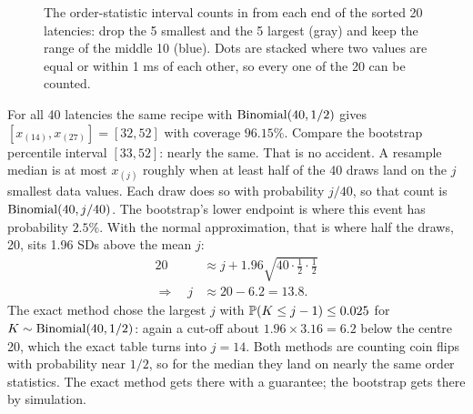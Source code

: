 \begin{figure}[H]
\centering
{}
\caption{The order-statistic interval counts in from each end of the sorted
20 latencies: drop the 5 smallest and the 5 largest (gray) and keep the range
of the middle 10 (blue). Dots are stacked where two values are equal or within
1 ms of each other, so every one of the 20 can be counted.}
\label{fig:bootstrap-orderstat}
\end{figure}

For all 40 latencies the same recipe with $\Bin(40, 1/2)$ gives
$[x_{(14)}, x_{(27)}] = [32, 52]$ with coverage $96.15\%$. Compare the
bootstrap percentile interval $[33, 52]$: nearly the same. That is no
accident. A resample median is at most $x_{(j)}$ roughly when at least half of
the 40 draws land on the $j$ smallest data values. Each draw does so with
probability $j/40$, so that count is $\Bin(40, j/40)$. The bootstrap's lower
endpoint is where this event has probability $2.5\%$. With the normal
approximation, that is where half the draws, 20, sits 1.96 SDs above the mean
$j$:
\begin{align*}
  20 &\approx j + 1.96\sqrt{40 \cdot \tfrac12 \cdot \tfrac12} \\
  \Longrightarrow\quad j &\approx 20 - 6.2 = 13.8 .
\end{align*}
The exact method chose the largest $j$ with $\P(K \le j-1) \le 0.025$ for
$K \sim \Bin(40, 1/2)$: again a cut-off about $1.96 \times 3.16 = 6.2$ below
the centre 20, which the exact table turns into $j = 14$. Both methods
are counting coin flips with probability near $1/2$, so for the median they
land on nearly the same order statistics. The exact method gets there with a
guarantee; the bootstrap gets there by simulation.

